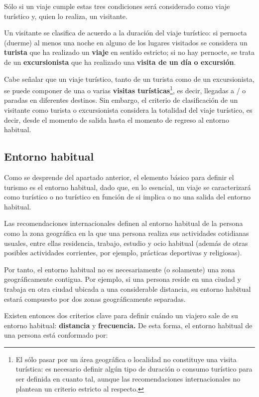\documentclass[
  openany]{book}
\begin{document}
Sólo si un viaje cumple estas tres condiciones será considerado como viaje turístico y, quien lo realiza, un visitante.

Un visitante se clasifica de acuerdo a la duración del viaje turístico: si pernocta (duerme) al menos una noche en alguno de los lugares visitados se considera un \textbf{turista} que ha realizado un \textbf{viaje} en sentido estricto; si no hay pernocte, se trata de un \textbf{excursionista} que ha realizado una \textbf{visita de un día o excursión}.

Cabe señalar que un viaje turístico, tanto de un turista como de un excursionista, se puede componer de una o varias \textbf{visitas turísticas}\footnote{El sólo pasar por un área geográfica o localidad no constituye una visita turística: es necesario definir algún tipo de duración o consumo turístico para ser definida en cuanto tal, aunque las recomendaciones internacionales no plantean un criterio estricto al respecto.}, es decir, llegadas a / o paradas en diferentes destinos. Sin embargo, el criterio de clasificación de un visitante como turista o excursionista considera la totalidad del viaje turístico, es decir, desde el momento de salida hasta el momento de regreso al entorno habitual.

\hypertarget{entorno-habitual}{%
\subsection{Entorno habitual}\label{entorno-habitual}}

Como se desprende del apartado anterior, el elemento básico para definir el turismo es el entorno habitual, dado que, en lo esencial, un viaje se caracterizará como turístico o no turístico en función de si implica o no una salida del entorno habitual.

Las recomendaciones internacionales definen al entorno habitual de la persona como la zona geográfica en la que una persona realiza sus actividades cotidianas usuales, entre ellas residencia, trabajo, estudio y ocio habitual (además de otras posibles actividades corrientes, por ejemplo, prácticas deportivas y religiosas).

Por tanto, el entorno habitual no es necesariamente (o solamente) una zona geográficamente contigua. Por ejemplo, si una persona reside en una ciudad y trabaja en otra ciudad ubicada a una considerable distancia, su entorno habitual estará compuesto por dos zonas geográficamente separadas.

Existen entonces dos criterios clave para definir cuándo un viajero sale de su entorno habitual: \textbf{distancia} y \textbf{frecuencia.} De esta forma, el entorno habitual de una persona está conformado por:
\end{document}
